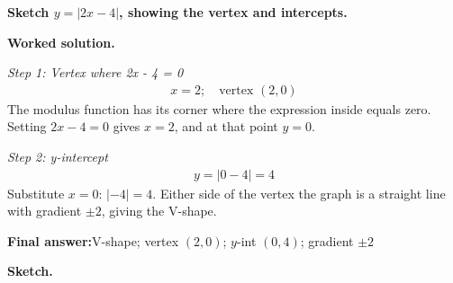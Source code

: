 \documentclass[11pt]{article}
\newcommand{\question}[1]{\par\medskip\noindent\textbf{#1}\par}
\begin{document}
\question{Sketch \( y = |2x - 4| \), showing the vertex and intercepts.}

\textbf{Worked solution.}

\textit{Step 1: Vertex where 2x - 4 = 0}
\[\begin{gathered}
x = 2; \quad \text{vertex } (2, 0)
\end{gathered}\]
The modulus function has its corner where the expression inside equals zero. Setting \( 2x - 4 = 0 \) gives \( x = 2 \), and at that point \( y = 0 \).

\textit{Step 2: y-intercept}
\[\begin{gathered}
y = |0-4| = 4
\end{gathered}\]
Substitute \( x = 0 \): \( |-4| = 4 \). Either side of the vertex the graph is a straight line with gradient \( \pm 2 \), giving the V-shape.

\begin{answerbox}
\textbf{Final answer:}\quad V-shape; vertex \(\displaystyle (2,0)\); \(\displaystyle y\)-int \(\displaystyle (0,4)\); gradient \(\displaystyle \pm 2\)
\end{answerbox}
\textbf{Sketch.}
\end{document}
